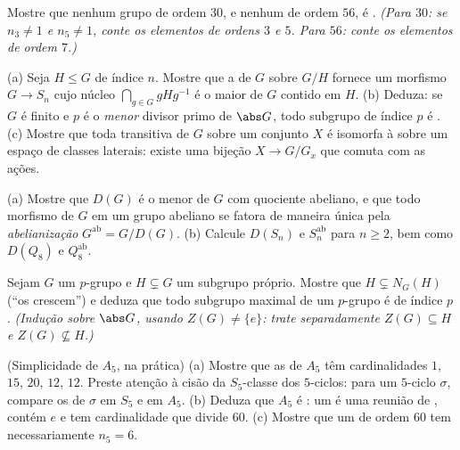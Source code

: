 \begin{exercise}[$\star\star$]\label{exo:b3:groups:7}
Mostre que nenhum grupo de ordem $30$, e nenhum de ordem $56$,
é . \emph{(Para $30$: se $n_3 \neq 1$ e $n_5 \neq 1$, conte os elementos
de ordens $3$ e $5$. Para $56$: conte os elementos de ordem
$7$.)}
\end{exercise}

\begin{exercise}[$\star\star$]\label{exo:b3:groups:8}
(a) Seja $H \leq G$ de índice $n$. Mostre que a  de $G$ sobre
$G/H$ fornece um morfismo $G \to S_n$ cujo núcleo $\bigcap_{g \in
G} gHg^{-1}$ é o maior
 de $G$ contido em $H$.
(b) Deduza: se $G$ é finito e $p$ é o \emph{menor} divisor
primo de $\abs G$, todo subgrupo de índice $p$ é .
(c) Mostre que toda  transitiva de $G$ sobre um conjunto
$X$ é isomorfa à  sobre um espaço de classes laterais: existe
uma bijeção $X
\to G/G_x$ que comuta com as ações.
\end{exercise}

\begin{exercise}[$\star\star$]\label{exo:b3:groups:9}
(a) Mostre que $D(G)$ é o menor  de $G$ com
quociente abeliano, e que todo morfismo de $G$ em um grupo abeliano
se fatora de maneira única pela \emph{abelianização} $G^{\mathrm{ab}} = G/D(G)$.
(b) Calcule $D(S_n)$ e $S_n^{\mathrm{ab}}$ para $n \geq 2$, bem como $D(Q_8)$ e
$Q_8^{\mathrm{ab}}$.
\end{exercise}

\begin{exercise}[$\star\star$]\label{exo:b3:groups:10}
Sejam $G$ um $p$-grupo e $H \subsetneq G$ um subgrupo próprio. Mostre que
$H \subsetneq N_G(H)$ (``os  crescem'') e deduza que todo subgrupo
maximal de um $p$-grupo é  de índice $p$.
\emph{(Indução sobre $\abs G$, usando $Z(G) \neq \{e\}$: trate separadamente
$Z(G) \subseteq H$ e $Z(G) \not\subseteq H$.)}
\end{exercise}

\begin{exercise}[$\star\star\star$]\label{exo:b3:groups:11}
(Simplicidade de $A_5$, na prática)
(a) Mostre que as  de $A_5$ têm cardinalidades
$1$, $15$, $20$, $12$, $12$. Preste atenção à
cisão da $S_5$-classe dos $5$-ciclos: para um $5$-ciclo
$\sigma$, compare os  de $\sigma$ em $S_5$ e
em $A_5$.
(b) Deduza que $A_5$ é : um  é uma reunião de
, contém $e$ e tem cardinalidade que divide
$60$.
(c) Mostre que um  de ordem $60$ tem necessariamente
$n_5 =
6$.
\end{exercise}


